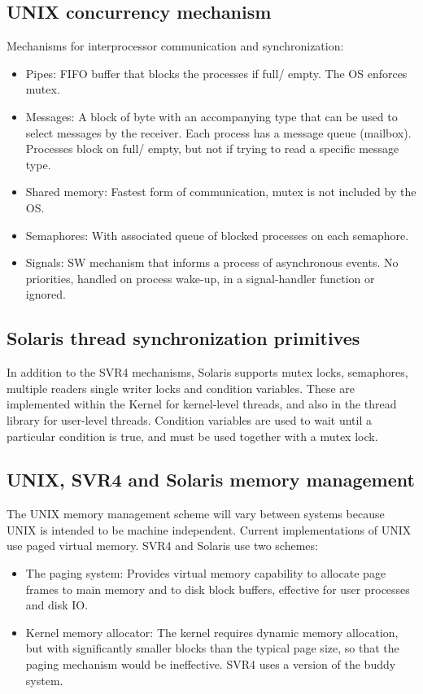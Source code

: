 \subsection{UNIX concurrency mechanism}
Mechanisms for interprocessor communication and synchronization:
\begin{itemize}
    \item Pipes: FIFO buffer that blocks the processes if full/ empty. The OS enforces mutex.
    \item Messages: A block of byte with an accompanying type that can be used to select messages by the receiver. Each process has a message queue (mailbox). Processes block on full/ empty, but not if trying to read a specific message type.
    \item Shared memory: Fastest form of communication, mutex is not included by the OS.
    \item Semaphores: With associated queue of blocked processes on each semaphore.
    \item Signals: SW mechanism that informs a process of asynchronous events. No priorities, handled on process wake-up, in a signal-handler function or ignored.
\end{itemize}

\subsection{Solaris thread synchronization primitives}
In addition to the SVR4 mechanisms, Solaris supports mutex locks, semaphores, multiple readers single writer locks and condition variables. These are implemented within the Kernel for kernel-level threads, and also in the thread library for user-level threads. Condition variables are used to wait until a particular condition is true, and must be used together with a mutex lock.

\subsection{UNIX, SVR4 and Solaris memory management}
The UNIX memory management scheme will vary between systems because UNIX is intended to be machine independent. Current implementations of UNIX use paged virtual memory. SVR4 and Solaris use two schemes:
\begin{itemize}
    \item The paging system: Provides virtual memory capability to allocate page frames to main memory and to disk block buffers, effective for user processes and disk IO.
    \item Kernel memory allocator: The kernel requires dynamic memory allocation, but with significantly smaller blocks than the typical page size, so that the paging mechanism would be ineffective. SVR4 uses a version of the buddy system.
\end{itemize}

